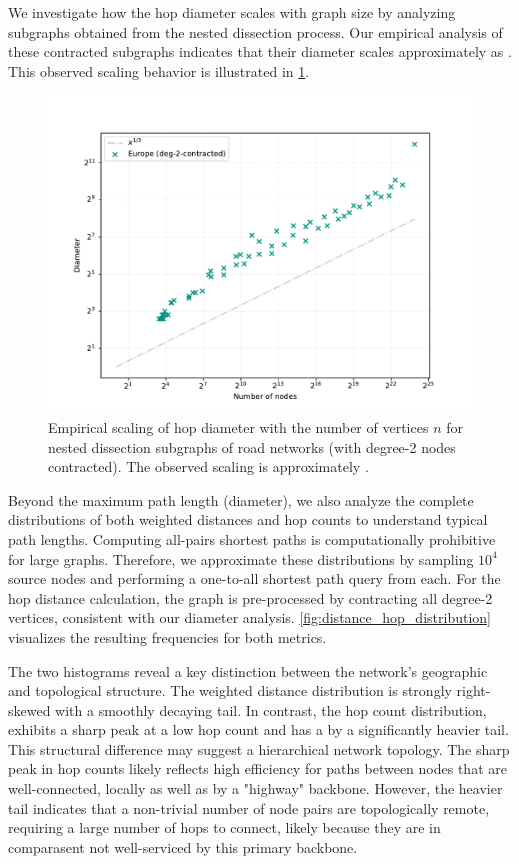 We investigate how the hop diameter scales with graph size by analyzing subgraphs obtained from the nested dissection process.
Our empirical analysis of these contracted subgraphs indicates that their diameter scales approximately as .
This observed scaling behavior is illustrated in \cref{fig:road_network_diameter_scaling}.

\begin{figure}[tbhp]
    \centering
    \includegraphics[width=0.7\linewidth]{graphics/diam-europe-ifub.pdf}
    \caption{Empirical scaling of hop diameter with the number of vertices \(n\) for nested dissection subgraphs of road networks (with degree-2 nodes contracted). The observed scaling is approximately .}
    \label{fig:road_network_diameter_scaling}
\end{figure}

Beyond the maximum path length (diameter), we also analyze the complete distributions of both weighted distances and hop counts to understand typical path lengths.
Computing all-pairs shortest paths is computationally prohibitive for large graphs.
Therefore, we approximate these distributions by sampling \(10^4\) source nodes and performing a one-to-all shortest path query from each.
For the hop distance calculation, the graph is pre-processed by contracting all degree-2 vertices, consistent with our diameter analysis.
\cref{fig:distance_hop_distribution} visualizes the resulting frequencies for both metrics.

The two histograms reveal a key distinction between the network's geographic and topological structure.
The weighted distance distribution is strongly right-skewed with a smoothly decaying tail.
In contrast, the hop count distribution, exhibits a sharp peak at a low hop count and has a by a significantly heavier tail.
This structural difference may suggest a hierarchical network topology.
The sharp peak in hop counts likely reflects high efficiency for paths between nodes that are well-connected, locally as well as by a "highway" backbone. However, the heavier tail indicates that a non-trivial number of node pairs are topologically remote, requiring a large number of hops to connect, likely because they are in comparasent not well-serviced by this primary backbone.

